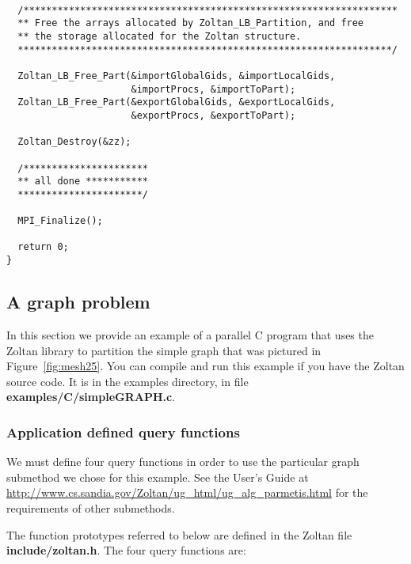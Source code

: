 \clearpage
\begin{flushleft}
\begin{verbatim}

  /******************************************************************
  ** Free the arrays allocated by Zoltan_LB_Partition, and free
  ** the storage allocated for the Zoltan structure.
  ******************************************************************/

  Zoltan_LB_Free_Part(&importGlobalGids, &importLocalGids, 
                      &importProcs, &importToPart);
  Zoltan_LB_Free_Part(&exportGlobalGids, &exportLocalGids, 
                      &exportProcs, &exportToPart);

  Zoltan_Destroy(&zz);

  /**********************
  ** all done ***********
  **********************/

  MPI_Finalize();

  return 0;
}

\end{verbatim}
\end{flushleft}

\clearpage
\subsection{A graph problem}

In this section we provide an example of a parallel C program
that uses the Zoltan library to partition the simple graph that
was pictured in Figure~\ref{fig:mesh25}.  You can compile
and run this example if you have the Zoltan source code.  It is
in the examples directory, in file \textbf{examples/C/simpleGRAPH.c}.

\subsubsection{Application defined query functions}

We must define four query functions in order to use the
particular graph submethod we chose for this example.  See the
User's Guide at
\url{http://www.cs.sandia.gov/Zoltan/ug_html/ug_alg_parmetis.html} for
the requirements of other submethods.

The function prototypes referred to below
are defined in the Zoltan file \textbf{include/zoltan.h}.
The four query functions are:

